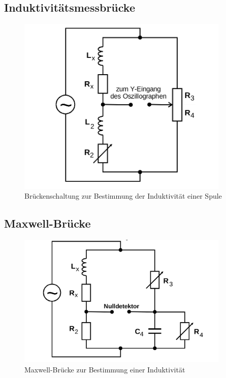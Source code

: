 \subsection{Induktivitätsmessbrücke}
\begin{figure}
  \centering
  \includegraphics[width=0.9\textwidth]{Bilder/Messbruecke_Spule_mit_R.png}
  \caption{Brückenschaltung zur Bestimmung der Induktivität einer Spule  \cite{Anleitung}}
  \label{fig:induktivitätsmessbrücke}
\end{figure}
\blindtext
\subsection{Maxwell-Brücke}
\begin{figure}
  \centering
  \includegraphics[width=0.9\textwidth]{Bilder/maxwell_bruecke.png}
  \caption{Maxwell-Brücke zur Bestimmung einer Induktivität \cite{Anleitung}}
  \label{fig:maxxwellbrücke}
\end{figure}

